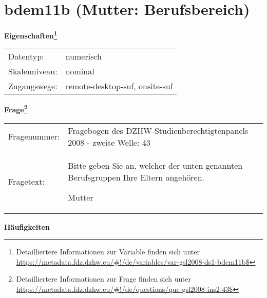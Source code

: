 
    \setcounter{footnote}{0}

    \vspace*{-1.8cm}
	\section{bdem11b (Mutter: Berufsbereich)}
	\label{section:bdem11b}



    \vspace*{0.5cm}
    \noindent\textbf{Eigenschaften\footnote{Detailliertere Informationen zur Variable finden sich unter
		\url{https://metadata.fdz.dzhw.eu/\#!/de/variables/var-gsl2008-ds1-bdem11b$}}}\\
	\begin{tabularx}{\hsize}{@{}lX}
	Datentyp: & numerisch \\
	Skalenniveau: & nominal \\
	Zugangswege: &
	  remote-desktop-suf, 
	  onsite-suf
 \\
    \end{tabularx}



				\vspace*{0.5cm}
                \noindent\textbf{Frage\footnote{Detailliertere Informationen zur Frage finden sich unter
		              \url{https://metadata.fdz.dzhw.eu/\#!/de/questions/que-gsl2008-ins2-43$}}}\\
				\begin{tabularx}{\hsize}{@{}lX}
					Fragenummer: &
					  Fragebogen des DZHW-Studienberechtigtenpanels 2008 - zweite Welle:
					  43
 \\
					Fragetext: & Bitte geben Sie an, welcher der unten genannten Berufsgruppen Ihre Eltern angehören.\par  Mutter \\
				\end{tabularx}





        		\vspace*{0.5cm}
                \noindent\textbf{Häufigkeiten}

